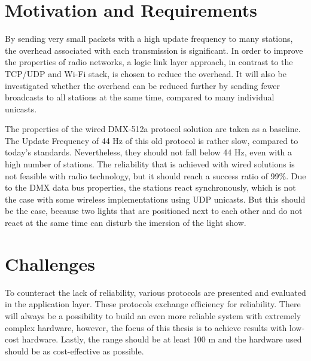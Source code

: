 \section*{Motivation and Requirements}

By sending very small packets with a high update frequency to many stations, 
the overhead associated with each transmission is significant.
In order to improve the properties of radio networks, a logic link layer approach,  
in contrast to the TCP/UDP and Wi-Fi stack, is chosen to reduce the overhead.
It will also be investigated whether the overhead 
can be reduced further by sending fewer broadcasts to all stations at the same time, compared to many individual unicasts.

The properties of the wired DMX-512a protocol solution are taken as a baseline.
The Update Frequency of 44 Hz of this old protocol is rather slow, compared to today's standards.
Nevertheless, they should not fall below 44 Hz, even with a high number of stations.
The reliability that is achieved with wired solutions is not feasible with radio technology,
but it should reach a success ratio of 99\%.
Due to the DMX data bus properties, the stations react synchronously, 
which is not the case with some wireless implementations using UDP unicasts. 
But this should be the case, because two lights that are positioned next to each other 
and do not react at the same time can disturb the imersion of the light show.

\section*{Challenges}

To counteract the lack of reliability, various protocols are presented and evaluated in the application layer.
These protocols exchange efficiency for reliability.
There will always be a possibility to build an even more reliable system with extremely complex hardware,
however, the focus of this thesis is to achieve results with low-cost hardware.
Lastly, the range should be at least 100 m and the hardware used should be as cost-effective as possible.

